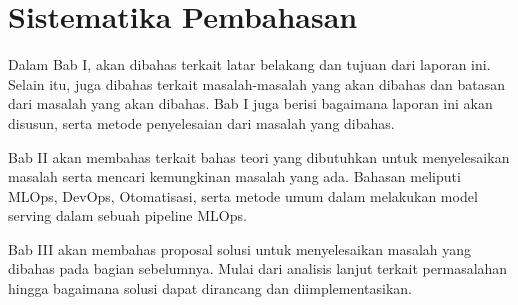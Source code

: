 \section{Sistematika Pembahasan}

Dalam Bab I, akan dibahas terkait latar belakang dan tujuan dari laporan ini.
Selain itu, juga dibahas terkait masalah-masalah yang akan dibahas dan batasan dari masalah yang akan dibahas.
Bab I juga berisi bagaimana laporan ini akan disusun, serta metode penyelesaian dari masalah yang dibahas.

Bab II akan membahas terkait bahas teori yang dibutuhkan untuk menyelesaikan masalah serta mencari kemungkinan masalah yang ada.
Bahasan meliputi MLOps, DevOps, Otomatisasi, serta metode umum dalam melakukan model serving dalam sebuah pipeline MLOps.

Bab III akan membahas proposal solusi untuk menyelesaikan masalah yang dibahas pada bagian sebelumnya.
Mulai dari analisis lanjut terkait permasalahan hingga bagaimana solusi dapat dirancang dan diimplementasikan.